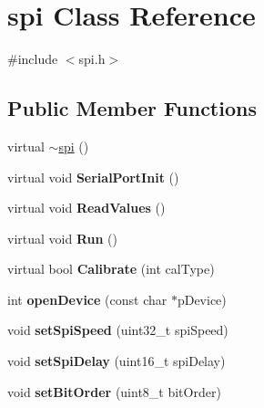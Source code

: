 \hypertarget{classspi}{\section{spi Class Reference}
\label{classspi}
}


{\ttfamily \#include $<$spi.\-h$>$}

\subsection*{Public Member Functions}
\begin{DoxyCompactItemize}
\item 
virtual \hyperlink{classspi_aa7039ccea879c1194360b401427f7b93}{$\sim$spi} ()
\item 
\hypertarget{classspi_a34b00f5bd260681619fee418239048a0}{virtual void {\bfseries Serial\-Port\-Init} ()}\label{classspi_a34b00f5bd260681619fee418239048a0}

\item 
\hypertarget{classspi_a94309b811b02a030d1a37eca9e27b286}{virtual void {\bfseries Read\-Values} ()}\label{classspi_a94309b811b02a030d1a37eca9e27b286}

\item 
\hypertarget{classspi_ab4c9b1d0f205e9dfac00107bc8fe1729}{virtual void {\bfseries Run} ()}\label{classspi_ab4c9b1d0f205e9dfac00107bc8fe1729}

\item 
\hypertarget{classspi_a1676554345a6127503f10d117f5b242d}{virtual bool {\bfseries Calibrate} (int cal\-Type)}\label{classspi_a1676554345a6127503f10d117f5b242d}

\item 
\hypertarget{classspi_ab5338399676761d03e503fa8f55ff4f6}{int {\bfseries open\-Device} (const char $\ast$p\-Device)}\label{classspi_ab5338399676761d03e503fa8f55ff4f6}

\item 
\hypertarget{classspi_af0e4702c999e07c9d2655cae8d12d1a4}{void {\bfseries set\-Spi\-Speed} (uint32\-\_\-t spi\-Speed)}\label{classspi_af0e4702c999e07c9d2655cae8d12d1a4}

\item 
\hypertarget{classspi_a24d0af0b21a8f58127d18c7cf77f0fd2}{void {\bfseries set\-Spi\-Delay} (uint16\-\_\-t spi\-Delay)}\label{classspi_a24d0af0b21a8f58127d18c7cf77f0fd2}

\item 
\hypertarget{classspi_aa81694fe53868e64ad9ef35e9003ac96}{void {\bfseries set\-Bit\-Order} (uint8\-\_\-t bit\-Order)}\label{classspi_aa81694fe53868e64ad9ef35e9003ac96}


\end{DoxyCompactItemize}
